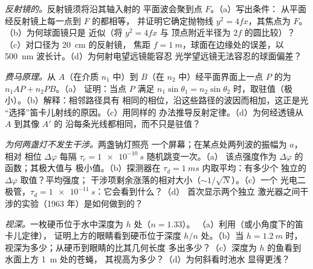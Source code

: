 \begin{exercise}[$\star\star$]\label{exo:b2:scalar-light-model:6}
\emph{反射镜的。}反射镜须将沿其轴入射的
平面波会聚到点 $F$。（a）写出条件：
从平面经反射镜上每一点到 $F$ 的都相等，
并证明它确定抛物线 $y^2 = 4fx$，其焦点为 $F$。（b）为何球面镜只是
近似（将 $y^2 = 4fx$ 与
顶点附近半径为 $2f$ 的圆比较）？（c）对口径为 \qty{20}{cm} 的反射镜，
焦距 $f = \qty{1}{m}$，球面在边缘处的误差，以
\qty{500}{nm} 波长计。（d）为何射电望远镜能容忍
光学望远镜无法容忍的球面偏差？
\end{exercise}

\begin{exercise}[$\star\star$]\label{exo:b2:scalar-light-model:7}
\emph{费马原理。}从 $A$（在介质 $n_1$ 中）到 $B$（在
$n_2$ 中）经平面界面上一点 $P$ 的为 $n_1AP + n_2PB$。（a）
证明：当点 $P$ 满足
$n_1\sin\theta_1 = n_2\sin\theta_2$ 时，取驻值（极小）。（b）解释：相邻路径具有
相同的相位，沿这些路径的波因而相加，这正是光
“选择”笛卡儿射线的原因。（c）用同样的
办法推导反射定律。（d）为何经透镜从 $A$ 到其像 $A'$ 的
沿每条光线都相同，而不只是驻值？
\end{exercise}

\begin{exercise}[$\star\star$]\label{exo:b2:scalar-light-model:8}
\emph{为何两盏灯不发生干涉。}两盏钠灯照亮
一个屏幕；在某点处两列波的振幅为 $a$，相对
相位 $\Delta\varphi$ 每隔 $\tau_c = \qty{1e-10}{s}$ 随机跳变一次。（a）
该点强度作为 $\Delta\varphi$ 的函数；其极大值与
极小值。（b）探测器在 $\tau_d = \qty{1}{ms}$ 内取平均：有多少个
独立的 $\Delta\varphi$ 取值？平均强度；
干涉项剩余涨落的相对大小（$\sim 1/\sqrt N$）。（c）一个
光电二极管，$\tau_d = \qty{1e-11}{s}$：它会看到什么？（d）
首次显示两个独立
激光器之间干涉的实验（1963 年）是如何做到的？
\end{exercise}

\begin{exercise}[$\star\star$]\label{exo:b2:scalar-light-model:9}
\emph{视深。}一枚硬币位于水中深度为 $h$ 处（$n = 1.33$）。
（a）利用（或小角度下的笛卡儿定律），
证明上方的眼睛看到硬币位于深度 $h/n$ 处。（b）当 $h = \qty{1.2}{m}$ 时，
视深为多少；从硬币到眼睛的比其几何长度
多出多少？（c）深度为 $h$ 的鱼看到水面上方 \qty{1}{m} 处的苍蝇，
其视高为多少？（d）为何斜看时池水
显得更浅？
\end{exercise}

